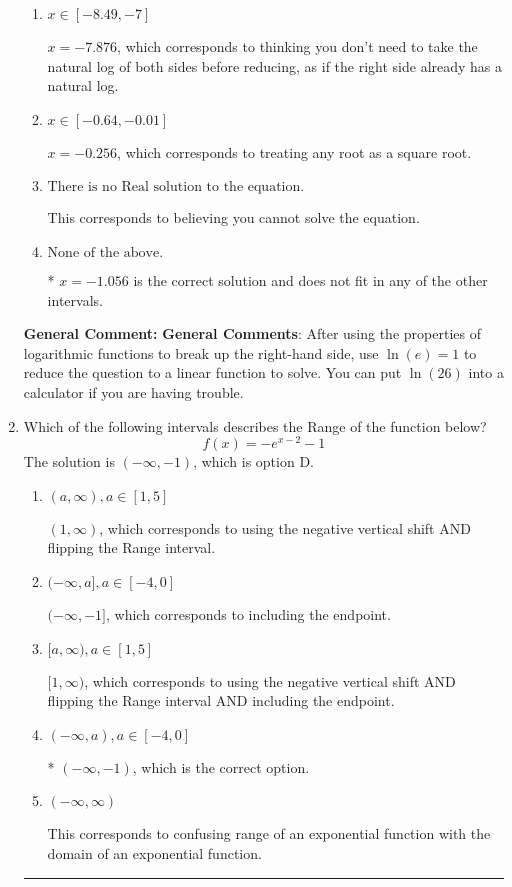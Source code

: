 \documentclass{extbook}[14pt]
\newcommand{\litem}[1]{\item #1

\rule{\textwidth}{0.4pt}}
\begin{document}
\begin{enumerate}
{\begin{enumerate}[label=\Alph*.]
$x = 1.056$, which is the negative of the correct solution.
\item \( x \in [-8.49, -7] \)

$x = -7.876$, which corresponds to thinking you don't need to take the natural log of both sides before reducing, as if the right side already has a natural log.
\item \( x \in [-0.64, -0.01] \)

$x = -0.256$, which corresponds to treating any root as a square root.
\item \( \text{There is no Real solution to the equation.} \)

This corresponds to believing you cannot solve the equation.
\item \( \text{None of the above.} \)

* $x = -1.056$ is the correct solution and does not fit in any of the other intervals.
\end{enumerate}

\textbf{General Comment:} \textbf{General Comments}: After using the properties of logarithmic functions to break up the right-hand side, use $\ln(e) = 1$ to reduce the question to a linear function to solve. You can put $\ln(26)$ into a calculator if you are having trouble.
}
\litem{
Which of the following intervals describes the Range of the function below?
\[ f(x) = -e^{x-2}-1 \]The solution is \( (-\infty, -1) \), which is option D.\begin{enumerate}[label=\Alph*.]
\item \( (a, \infty), a \in [1, 5] \)

$(1, \infty)$, which corresponds to using the negative vertical shift AND flipping the Range interval.
\item \( (-\infty, a], a \in [-4, 0] \)

$(-\infty, -1]$, which corresponds to including the endpoint.
\item \( [a, \infty), a \in [1, 5] \)

$[1, \infty)$, which corresponds to using the negative vertical shift AND flipping the Range interval AND including the endpoint.
\item \( (-\infty, a), a \in [-4, 0] \)

* $(-\infty, -1)$, which is the correct option.
\item \( (-\infty, \infty) \)

This corresponds to confusing range of an exponential function with the domain of an exponential function.
\end{enumerate}

}
\end{enumerate}
\end{document}
